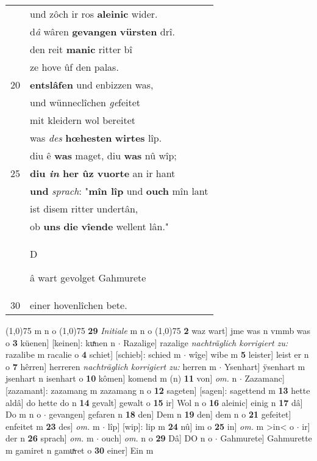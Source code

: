 \documentclass[8pt,a4paper,notitlepage]{article}
\begin{document}
\begin{table}[ht]
\begin{minipage}[t]{0.5\linewidth}
\begin{tabular}{rl}
 & und zôch ir ros \textbf{aleinic} wider.\\ 
 & d\textit{â} wâren \textbf{gevangen} \textbf{vürsten} drî.\\ 
 & den reit \textbf{manic} ritter bî\\ 
 & ze hove ûf den palas.\\ 
20 & \textbf{entslâfen} und enbizzen was,\\ 
 & und wünneclîchen \textit{ge}feitet\\ 
 & mit kleidern wol bereitet\\ 
 & was \textit{des} \textbf{hœhesten} \textbf{wirtes} lîp.\\ 
 & diu ê \textbf{was} maget, diu \textbf{was} nû wîp;\\ 
25 & \textbf{diu \textit{in} her ûz vuorte} an ir hant\\ 
 & \textbf{und} \textit{sprach}: "\textbf{mîn lîp} und \textbf{ouch} mîn lant\\ 
 & ist disem ritter undertân,\\ 
 & ob \textbf{uns} \textbf{die} \textbf{vîende} wellent lân."\\ 
 & \begin{large}D\end{large}â wart gevolget Gahmurete\\ 
30 & einer hovenlîchen bete.\\ 
\end{tabular}
\scriptsize
\line(1,0){75} \newline
m n o \newline
\line(1,0){75} \newline
\textbf{29} \textit{Initiale} m n o  \newline
\line(1,0){75} \newline
\textbf{2} waz wart] jme was n vmmb was o \textbf{3} küenen] [keinen]: kuͯnen n  $\cdot$ Razalige] razalige \textit{nachträglich korrigiert zu:} razalibe m racalie o \textbf{4} schiet] [schieb]: schied m  $\cdot$ wîge] wibe m \textbf{5} leister] leist er n o \textbf{7} hêrren] herreren \textit{nachträglich korrigiert zu:} herren m  $\cdot$ Ysenhart] ÿsenhart m jsenhart n isenhart o \textbf{10} kômen] komend m (n) \textbf{11} von] \textit{om.} n  $\cdot$ Zazamanc] [zazamant]: zazamang m zazamang n o \textbf{12} sageten] [sagen]: sagettend m \textbf{13} hette aldâ] do hette do n \textbf{14} gevalt] gewalt o \textbf{15} ir] Wol n o \textbf{16} aleinic] einig n \textbf{17} dâ] Do m n o  $\cdot$ gevangen] gefaren n \textbf{18} den] Dem n \textbf{19} den] dem n o \textbf{21} gefeitet] enfeitet m \textbf{23} des] \textit{om.} m  $\cdot$ lîp] [wip]: lip m \textbf{24} nû] im o \textbf{25} in] \textit{om.} m >in< o  $\cdot$ ir] der n \textbf{26} sprach] \textit{om.} m  $\cdot$ ouch] \textit{om.} n o \textbf{29} Dâ] DO n o  $\cdot$ Gahmurete] Gahmurette m gamiret n gamuͯret o \textbf{30} einer] Ein m \newline
\end{minipage}
\end{table}
\end{document}
